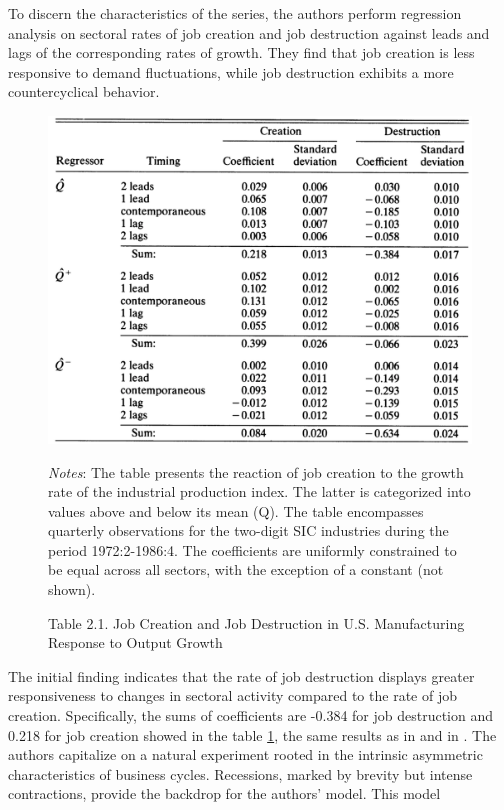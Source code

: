 \documentclass[12pt]{article}
\begin{document}
To discern the characteristics of the series, the authors perform regression analysis on sectoral rates of job creation
and job destruction against leads and lags of the corresponding rates of growth. They find that job creation is less
responsive to demand fluctuations, while job destruction exhibits a more countercyclical behavior. 
\begin{figure}
    \centering
    \includegraphics[scale = 0.4]{Plot2.3.png}
    \caption{Table 2.1. Job Creation and Job Destruction in U.S. Manufacturing Response to Output Growth}
    \label{Table 2.1.}
    \footnotesize \textit{Notes}: The table presents the reaction of job creation to the growth rate of the industrial
    production index. The latter is categorized into values above and below its mean (Q). The table encompasses
    quarterly observations for the two-digit SIC industries during the period 1972:2-1986:4. The coefficients are
    uniformly constrained to be equal across all sectors, with the exception of a constant (not shown).  
\end{figure}
The initial finding indicates that the rate of job destruction displays greater responsiveness to changes in sectoral
activity compared to the rate of job creation. Specifically, the sums of coefficients are -0.384 for job destruction and
0.218 for job creation showed in the table \ref{Table 2.1.}, the same results as in \cite{DAvHalt90,DavHalt92} and in
\cite{BlaDia90}.
The authors capitalize on a natural experiment rooted in the intrinsic asymmetric characteristics of business cycles.
Recessions, marked by brevity but intense contractions, provide the backdrop for the authors' model. This model
\end{document}
